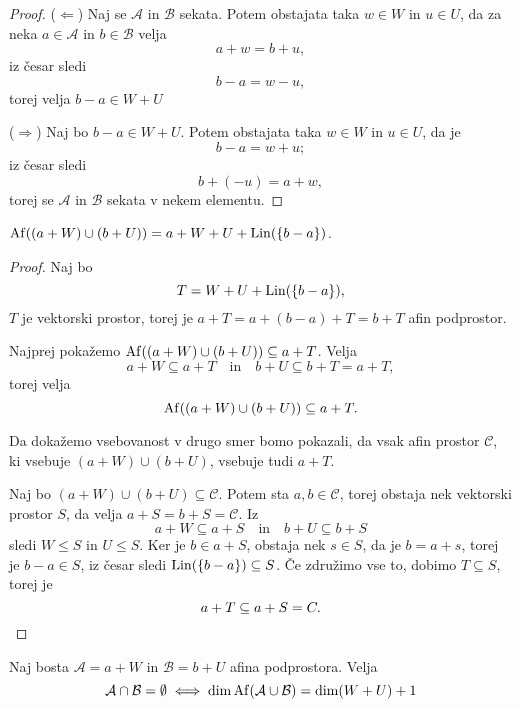 \begin{proof}
    ($\Leftarrow$)
    Naj se $\mathcal{A}$ in $\mathcal{B}$ sekata. Potem obstajata taka $w \in W$ in $u \in U$, da za neka $a \in \mathcal{A}$ in $b \in \mathcal{B}$ velja
    \[
    a + w = b + u,    
    \]
    iz česar sledi
    \[
    b - a = w - u,    
    \]
    torej velja $b - a \in W + U$

    ($\Rightarrow$)
    Naj bo $b - a \in W + U$. Potem obstajata taka $w \in W$ in $u \in U$, da je
    \[
    b - a = w + u;    
    \]
    iz česar sledi
    \[
    b + (- u) = a + w,    
    \]
    torej se $\mathcal{A}$ in $\mathcal{B}$ sekata v nekem elementu.
\end{proof}

\begin{lema}
    $\operatorname{Af} ((a + W) \cup (b + U)) = a + W + U + \operatorname{Lin} (\left\{b - a\right\})$.
\end{lema}

\begin{proof}
    Naj bo 
    \[
    T = W + U + \operatorname{Lin} (\left\{b - a\right\}),
    \]
    $T$ je vektorski prostor, torej je $a + T = a + (b - a) + T = b + T$ afin podprostor.

    Najprej pokažemo $\operatorname{Af} ((a + W) \cup (b + U)) \subseteq a + T$. Velja
    \[
        a + W \subseteq a + T
        \quad \text{in} \quad
        b + U \subseteq b + T = a + T,
    \]
    torej velja
    \[
    \operatorname{Af} ((a + W) \cup (b + U)) \subseteq a + T.
    \]

    Da dokažemo vsebovanost v drugo smer bomo pokazali, da vsak afin prostor $\mathcal{C}$, ki vsebuje $(a + W) \cup (b + U)$, vsebuje tudi $a + T$.

    Naj bo $(a + W) \cup (b + U) \subseteq \mathcal{C}$. Potem sta $a, b \in \mathcal{C}$, torej obstaja nek vektorski prostor $S$, da velja $a + S = b + S = \mathcal{C}$. Iz
    \[
        a + W \subseteq a + S
        \quad \text{in} \quad
        b + U \subseteq b + S
    \]
    sledi $W \leq S$ in $U \leq S$. Ker je $b \in a + S$, obstaja nek $s \in S$, da je $b = a + s$, torej je $b - a \in S$, iz česar sledi $\operatorname{Lin} (\left\{b - a\right\}) \subseteq S$.
    Če združimo vse to, dobimo $T \subseteq S$, torej je
    \[
    a + T \subseteq a + S = C. \qedhere
    \] 
\end{proof}

\begin{trditev}
    Naj bosta $\mathcal{A} = a + W$ in $\mathcal{B} = b + U$ afina podprostora. Velja
    \[
    \mathcal{A} \cap \mathcal{B} = \emptyset \iff \dim \operatorname{Af} ( \mathcal{A} \cup \mathcal{B} ) = \dim (W + U) + 1
    \]
\end{trditev}

